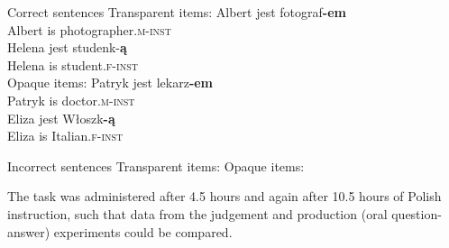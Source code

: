 \documentclass[output=paper,colorlinks,citecolor=brown,modfonts,nonflat]{../langscibook}
\begin{document}
\ea%
    \label{ex:watorek:1}
    Correct sentences
    \ea%
    \label{ex:watorek:1a}
    Transparent items:
        \ea%
        \label{ex:watorek:1ai}
        \gll    Albert jest fotograf\textbf{{-em}}\\
                Albert is photographer\textsc{.m-inst}\\
        \ex%
        \label{ex:watorek:1aii}
        \gll    Helena jest studenk-\textbf{{ą}}\\
                Helena is student\textsc{.f-inst}\\
        \z
    \ex%
    \label{ex:watorek:1b}
    Opaque items:
        \ea%
        \label{ex:watorek:1bi}
        \gll    Patryk jest lekarz\textbf{{-em}}\\
                Patryk is doctor\textsc{.m-inst}\\
        \ex%
        \label{ex:watorek:1bii}
        \gll    Eliza jest Włoszk\textbf{{-ą}}\\
                Eliza is Italian\textsc{.f-inst}\\
        \z
    \z
\z

\ea%
    \label{ex:watorek:2}
    Incorrect sentences
    \ea%
    \label{ex:watorek:2a}
    Transparent items:
        \z
    \ex%
    \label{ex:watorek:2b}
    Opaque items:
        \z
    \z
\z

The task was administered after 4.5 hours and again after 10.5 hours of Polish instruction, such that data from the judgement and production (oral question-answer) experiments could be compared. 
\end{document}
